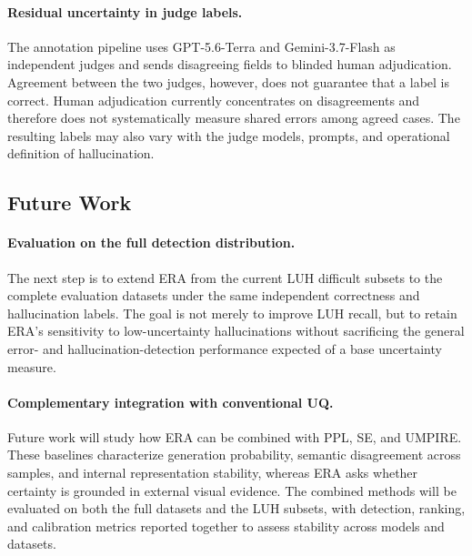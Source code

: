 \paragraph{Residual uncertainty in judge labels.}
The annotation pipeline uses GPT-5.6-Terra and Gemini-3.7-Flash as independent judges and sends disagreeing fields to blinded human adjudication. Agreement between the two judges, however, does not guarantee that a label is correct. Human adjudication currently concentrates on disagreements and therefore does not systematically measure shared errors among agreed cases. The resulting labels may also vary with the judge models, prompts, and operational definition of hallucination.

\subsection{Future Work}

\paragraph{Evaluation on the full detection distribution.}
The next step is to extend ERA from the current LUH difficult subsets to the complete evaluation datasets under the same independent correctness and hallucination labels. The goal is not merely to improve LUH recall, but to retain ERA's sensitivity to low-uncertainty hallucinations without sacrificing the general error- and hallucination-detection performance expected of a base uncertainty measure.

\paragraph{Complementary integration with conventional UQ.}
Future work will study how ERA can be combined with PPL, SE, and UMPIRE. These baselines characterize generation probability, semantic disagreement across samples, and internal representation stability, whereas ERA asks whether certainty is grounded in external visual evidence. The combined methods will be evaluated on both the full datasets and the LUH subsets, with detection, ranking, and calibration metrics reported together to assess stability across models and datasets.

